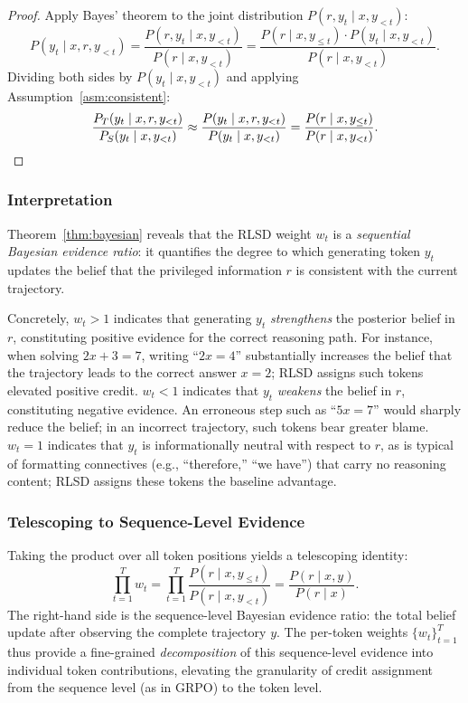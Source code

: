 \documentclass[]{jingdong}
\begin{document}
\begin{proof}
Apply Bayes' theorem to the joint distribution $P(r, y_t \mid x, y_{<t})$:
\begin{equation}
    P(y_t \mid x, r, y_{<t}) = \frac{P(r, y_t \mid x, y_{<t})}{P(r \mid x, y_{<t})} = \frac{P(r \mid x, y_{\leq t}) \cdot P(y_t \mid x, y_{<t})}{P(r \mid x, y_{<t})}.
\end{equation}
Dividing both sides by $P(y_t \mid x, y_{<t})$ and applying Assumption~\ref{asm:consistent}:
\begin{equation}
    \frac{P_T(y_t \mid x, r, y_{<t})}{P_S(y_t \mid x, y_{<t})} \approx \frac{P(y_t \mid x, r, y_{<t})}{P(y_t \mid x, y_{<t})} = \frac{P(r \mid x, y_{\leq t})}{P(r \mid x, y_{<t})}. \qedhere
\end{equation}
\end{proof}


\subsubsection{Interpretation}

Theorem~\ref{thm:bayesian} reveals that the RLSD weight $w_t$ is a \textit{sequential Bayesian evidence ratio}: it quantifies the degree to which generating token $y_t$ updates the belief that the privileged information $r$ is consistent with the current trajectory.

Concretely, $w_t > 1$ indicates that generating $y_t$ \textit{strengthens} the posterior belief in $r$, constituting positive evidence for the correct reasoning path. For instance, when solving $2x + 3 = 7$, writing ``$2x = 4$'' substantially increases the belief that the trajectory leads to the correct answer $x = 2$; RLSD assigns such tokens elevated positive credit. $w_t < 1$ indicates that $y_t$ \textit{weakens} the belief in $r$, constituting negative evidence. An erroneous step such as ``$5x = 7$'' would sharply reduce the belief; in an incorrect trajectory, such tokens bear greater blame. $w_t = 1$ indicates that $y_t$ is informationally neutral with respect to $r$, as is typical of formatting connectives (e.g., ``therefore,'' ``we have'') that carry no reasoning content; RLSD assigns these tokens the baseline advantage.


\subsubsection{Telescoping to Sequence-Level Evidence}

Taking the product over all token positions yields a telescoping identity:
\begin{equation}
    \prod_{t=1}^{T} w_t = \prod_{t=1}^{T} \frac{P(r \mid x, y_{\leq t})}{P(r \mid x, y_{<t})} = \frac{P(r \mid x, y)}{P(r \mid x)}.
\end{equation}
The right-hand side is the sequence-level Bayesian evidence ratio: the total belief update after observing the complete trajectory $y$. The per-token weights $\{w_t\}_{t=1}^T$ thus provide a fine-grained \textit{decomposition} of this sequence-level evidence into individual token contributions, elevating the granularity of credit assignment from the sequence level (as in GRPO) to the token level.
\end{document}
